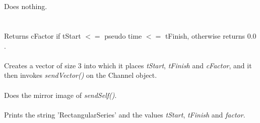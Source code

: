  \\
\\ 
Does nothing. \\

 \\
\\
Returns cFactor if tStart $<=$ pseudo time $<=$ tFinish, otherwise
returns $0.0$. \\ 

\\
Creates a vector of size 3 into which it places {\em tStart}, {\em
tFinish} and {\em cFactor}, and it then invokes {\em sendVector()} on
the Channel object. \\ 

\\
Does the mirror image of {\em sendSelf()}. \\

\\
Prints the string 'RectangularSeries' and the values {\em tStart}, {\em
tFinish} and {\em factor}. 